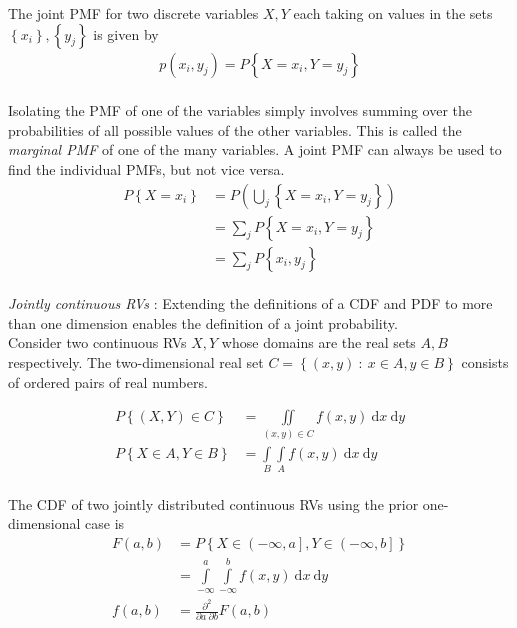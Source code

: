 The joint PMF for two discrete variables $ X, Y $ each taking on values in the sets $ \left\{ x_i \right\}, \left\{ y_j \right\} $ is given by \\

\begin{align}
	p(x_i, y_j) = P \left\{ X = x_i, Y = y_j \right\}
\end{align}\\

Isolating the PMF of one of the variables simply involves summing over the probabilities of all possible values of the other variables. This is called the \textit{marginal PMF} of one of the many variables. A joint PMF can always be used to find the individual PMFs, but not vice versa.\\

\begin{align}
	P \left\{ X = x_i \right\} &= P \left( \bigcup_{j} \left\{ X = x_i, Y = y_j \right\} \right)  \nonumber\\
	&= \sum\limits_{j} P \left\{ X = x_i, Y = y_j \right\} \nonumber\\
	&= \sum\limits_{j} P \left\{x_i,y_j \right\}
\end{align} \\

\textit{Jointly continuous RVs} : Extending the definitions of a CDF and PDF to more than one dimension enables the definition of a joint probability. \\

Consider two continuous RVs $ X, Y $ whose domains are the real sets $ A, B $ respectively. The two-dimensional real set $ C = \left\{ (x,y) \ :\ x \in A, y \in B  \right\} $ consists of ordered pairs of real numbers.

\begin{align}
	P \left\{ (X, Y) \in C \right\} &= \iint\limits_{(x, y) \in C} f(x,y)\ \mathrm{d}x \  \mathrm{d}y \\
	P \left\{ X \in A, Y \in B \right\} &= \int\limits_{B} \int\limits_{A} f(x,y)\ \mathrm{d}x \  \mathrm{d}y
\end{align} \\

The CDF of two jointly distributed continuous RVs using the prior one-dimensional case is\\

\begin{align}
	F(a, b) &= P \left\{ X \in \left( -\infty, a \right],  Y \in \left( -\infty, b \right] \right\} \nonumber \\
	&= \int\limits_{-\infty}^{a} \int\limits_{-\infty}^{b} f(x,y)\ \mathrm{d}x \  \mathrm{d}y \\
	f(a, b) &= \frac{\partial^2}{\partial a\  \partial b} F(a, b)
\end{align} \\

